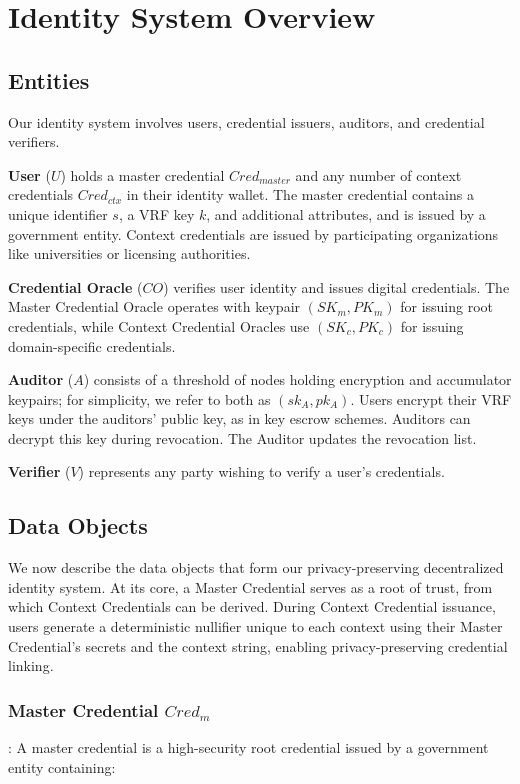 \cleardoublepage
\section{Identity System Overview}

\subsection{Entities}
Our identity system involves users, credential issuers, auditors, and credential verifiers.

\noindent \textbf{User} ($U$) holds a master credential $Cred_{master}$ and any number of context credentials $Cred_{ctx}$ in their identity wallet. The master credential contains a unique identifier $s$, a VRF key $k$, and additional attributes, and is issued by a government entity. Context credentials are issued by participating organizations like universities or licensing authorities.

\noindent \textbf{Credential Oracle} ($CO$) verifies user identity and issues digital credentials. The Master Credential Oracle operates with keypair $(SK_{m}, PK_{m})$ for issuing root credentials, while Context Credential Oracles use $(SK_{c}, PK_{c})$ for issuing domain-specific credentials.

\noindent \textbf{Auditor} ($A$) consists of a threshold of nodes holding encryption and accumulator keypairs; for simplicity, we refer to both as $(sk_A, pk_A)$. Users encrypt their VRF keys under the auditors' public key, as in key escrow schemes. Auditors can decrypt this key during revocation. The Auditor updates the revocation list. 

\noindent \textbf{Verifier} ($V$) represents any party wishing to verify a user's credentials.


\subsection{Data Objects}

We now describe the data objects that form our privacy-preserving decentralized identity system. At its core, a Master Credential serves as a root of trust, from which Context Credentials can be derived. During Context Credential issuance, users generate a deterministic nullifier unique to each context using their Master Credential's secrets and the context string, enabling privacy-preserving credential linking.

\subsubsection{Master Credential $Cred_m$}: 
A master credential is a high-security root credential issued by a government entity containing:

